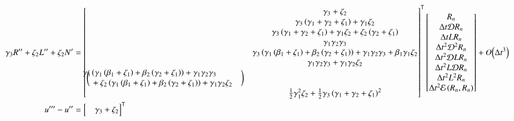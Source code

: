 \documentclass[letterpaper,11pt]{amsart}
\newcommand{\trans}[1]{{#1}^{\ensuremath{\mathsf{T}}}}
\newcommand{\order}[2]{\ensuremath{O\!\left( {#1}^{#2} \right)}}
\begin{document}
\begin{align}
      \gamma_{3} R''
    + \zeta_{2}  L''
    + \zeta_{2}  N'
  &=
\trans{\begin{bmatrix}
  &\gamma_{3} + \zeta_{2} \\
    &\gamma_{3} \left( \gamma_{1} + \gamma_{2} + \zeta_{1} \right)
  + \gamma_{1} \zeta_{2} \\
    &\gamma_{3} \left( \gamma_{1} + \gamma_{2} + \zeta_{1} \right)
  + \gamma_{1} \zeta_{2}
  + \zeta_{2} \left( \gamma_{2} + \zeta_{1} \right) \\
  &\gamma_{1} \gamma_{2} \gamma_{3} \\
    &\gamma_{3} \left(
       \gamma_{1} \left(\beta_{1}+\zeta_{1}\right)
      +\beta_{2} \left(\gamma_{2}+\zeta_{1}\right)
    \right)
  + \gamma_{1} \gamma_{2} \gamma_{3}
  + \beta_{1} \gamma_{1} \zeta_{2} \\
    &\gamma_{1} \gamma_{2} \gamma_{3}
  + \gamma_{1} \gamma_{2} \zeta_{2} \\
%
\bigg(\mspace{-18mu}
\begin{split}
    &\gamma_{3} \left(
       \gamma_{1} \left(\beta_{1}+\zeta_{1}\right)
      +\beta_{2} \left(\gamma_{2}+\zeta_{1}\right)
    \right)
  + \gamma_{1} \gamma_{2} \gamma_{3}
  \\
  &\quad+ \zeta_{2} \left(
       \gamma_{1} \left(\beta_{1}+\zeta_{1}\right)
      +\beta_{2} \left(\gamma_{2}+\zeta_{1}\right)
    \right)
  + \gamma_{1} \gamma_{2} \zeta_{2}
\end{split}
\mspace{18mu}\bigg)
  \\
%
    &\frac{1}{2}\gamma_{1}^{2}\zeta_{2}
  + \frac{1}{2}\gamma_{3}\left( \gamma_{1} + \gamma_{2} + \zeta_{1} \right)^{2}
\end{bmatrix}}
\begin{bmatrix}
  R_{n} \\
  \Delta{}t \mathcal{D} R_{n} \\
  \Delta{}t L R_{n} \\
  \Delta{}t^{2} \mathcal{D}^{2} R_{n} \\
  \Delta{}t^{2} \mathcal{D} L R_{n} \\
  \Delta{}t^{2} L \mathcal{D} R_{n} \\
  \Delta{}t^{2} L^{2} R_{n} \\
  \Delta{}t^{2} \mathcal{E}\left( R_{n}, R_{n} \right)
\end{bmatrix}
  + \order{\Delta{}t}{3}
\\
  u'''-u''
  &=
\trans{\begin{bmatrix}
  &\gamma_{3} + \zeta_{2} \\

\end{bmatrix}}
\end{align}
\end{document}
